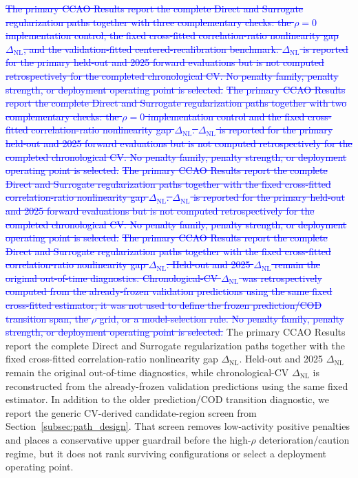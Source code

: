 \documentclass[10pt]{article}
\theoremstyle{definition}
\newcommand{\1}{\mathbf{1}}
\newcommand{\oldtext}[1]{\textcolor{blue}{\sout{#1}}}
\newcommand{\latesttext}[1]{\textcolor{latestPurple}{#1}}
\begin{document}
\oldtext{The primary CCAO Results report the complete Direct and Surrogate regularization paths together with three complementary checks: the $\rho=0$ implementation control, the fixed cross-fitted correlation-ratio nonlinearity gap $\Delta_{\mathrm{NL}}$, and the validation-fitted centered-recalibration benchmark. $\Delta_{\mathrm{NL}}$ is reported for the primary held-out and 2025 forward evaluations but is not computed retrospectively for the completed chronological CV. No penalty family, penalty strength, or deployment operating point is selected.}
\oldtext{The primary CCAO Results report the complete Direct and Surrogate regularization paths together with two complementary checks: the $\rho=0$ implementation control and the fixed cross-fitted correlation-ratio nonlinearity gap $\Delta_{\mathrm{NL}}$. $\Delta_{\mathrm{NL}}$ is reported for the primary held-out and 2025 forward evaluations but is not computed retrospectively for the completed chronological CV. No penalty family, penalty strength, or deployment operating point is selected.}
\oldtext{The primary CCAO Results report the complete Direct and Surrogate regularization paths together with the fixed cross-fitted correlation-ratio nonlinearity gap $\Delta_{\mathrm{NL}}$. $\Delta_{\mathrm{NL}}$ is reported for the primary held-out and 2025 forward evaluations but is not computed retrospectively for the completed chronological CV. No penalty family, penalty strength, or deployment operating point is selected.}
\oldtext{The primary CCAO Results report the complete Direct and Surrogate regularization paths together with the fixed cross-fitted correlation-ratio nonlinearity gap $\Delta_{\mathrm{NL}}$. Held-out and 2025 $\Delta_{\mathrm{NL}}$ remain the original out-of-time diagnostics. Chronological-CV $\Delta_{\mathrm{NL}}$ was retrospectively computed from the already-frozen validation predictions using the same fixed cross-fitted estimator; it was not used to define the frozen prediction/COD transition span, the $\rho$ grid, or a model-selection rule. No penalty family, penalty strength, or deployment operating point is selected.}
\latesttext{The primary CCAO Results report the complete Direct and Surrogate regularization paths together with the fixed cross-fitted correlation-ratio nonlinearity gap $\Delta_{\mathrm{NL}}$. Held-out and 2025 $\Delta_{\mathrm{NL}}$ remain the original out-of-time diagnostics, while chronological-CV $\Delta_{\mathrm{NL}}$ is reconstructed from the already-frozen validation predictions using the same fixed estimator. In addition to the older prediction/COD transition diagnostic, we report the generic CV-derived candidate-region screen from Section~\ref{subsec:path_design}. That screen removes low-activity positive penalties and places a conservative upper guardrail before the high-$\rho$ deterioration/caution regime, but it does not rank surviving configurations or select a deployment operating point.}
\end{document}

